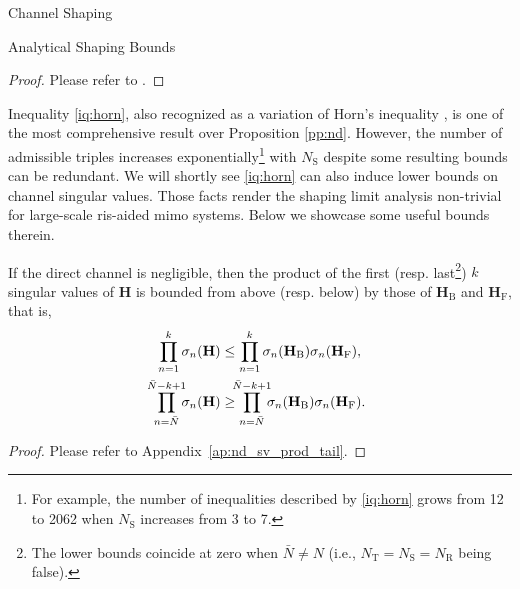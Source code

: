 \documentclass[journal]{IEEEtran}
\begin{document}
\begin{section}{Channel Shaping}
\begin{subsection}{Analytical Shaping Bounds}
		\begin{proof}
			Please refer to \cite[Theorem~8]{Fulton2000}.
		\end{proof}

		Inequality \eqref{iq:horn}, also recognized as a variation of Horn's inequality \cite{Bhatia2001}, is one of the most comprehensive result over Proposition \ref{pp:nd}.
		However, the number of admissible triples increases exponentially\footnote{For example, the number of inequalities described by \eqref{iq:horn} grows from 12 to 2062 when $N_\mathrm{S}$ increases from 3 to 7.} with $N_\mathrm{S}$ despite some resulting bounds can be redundant.
		We will shortly see \eqref{iq:horn} can also induce lower bounds on channel singular values.
		Those facts render the shaping limit analysis non-trivial for large-scale \gls{ris}-aided \gls{mimo} systems.
		Below we showcase some useful bounds therein.

		\begin{corollary}
			\label{co:nd_sv_prod_tail}
			If the direct channel is negligible,
			then the product of the first (resp. last\footnote{The lower bounds coincide at zero when $\bar{N} \ne N$ (i.e., $N_\mathrm{T} = N_\mathrm{S} = N_\mathrm{R}$ being false).}) $k$ singular values of $\mathbf{H}$ is bounded from above (resp. below) by those of $\mathbf{H}_\mathrm{B}$ and $\mathbf{H}_\mathrm{F}$, that is,
			\begin{subequations}
				\begin{align}
					\prod_{n=1}^k \sigma_n(\mathbf{H})                   & \le \prod_{n=1}^k \sigma_n(\mathbf{H}_\mathrm{B}) \sigma_n(\mathbf{H}_\mathrm{F}), \label{iq:sv_nd_prod_largest}                    \\
					\prod_{n=\bar{N}}^{\mathclap{\bar{N}-k+1}} \sigma_n(\mathbf{H}) & \ge \prod_{n=\bar{N}}^{\mathclap{\bar{N}-k+1}} \sigma_n(\mathbf{H}_\mathrm{B}) \sigma_n(\mathbf{H}_\mathrm{F}). \label{iq:sv_nd_prod_smallest}
				\end{align}
			\end{subequations}
		\end{corollary}

		\begin{proof}
			Please refer to Appendix~\ref{ap:nd_sv_prod_tail}.
		\end{proof}


\end{subsection}
\end{section}
\end{document}
